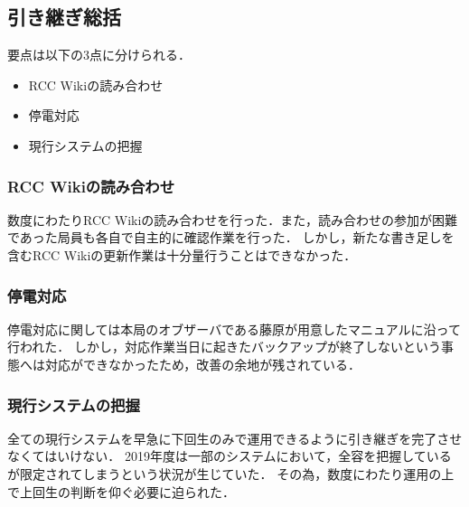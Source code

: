 \subsection*{引き継ぎ総括}


要点は以下の3点に分けられる．
 \begin{itemize}
\item RCC Wikiの読み合わせ
\item 停電対応
\item 現行システムの把握
 \end{itemize}
\subsubsection* {RCC Wikiの読み合わせ}
数度にわたりRCC Wikiの読み合わせを行った．また，読み合わせの参加が困難であった局員も各自で自主的に確認作業を行った．
しかし，新たな書き足しを含むRCC Wikiの更新作業は十分量行うことはできなかった．
\subsubsection* {停電対応}
停電対応に関しては本局のオブザーバである藤原が用意したマニュアルに沿って行われた．
しかし，対応作業当日に起きたバックアップが終了しないという事態へは対応ができなかったため，改善の余地が残されている．
\subsubsection* {現行システムの把握}
全ての現行システムを早急に下回生のみで運用できるように引き継ぎを完了させなくてはいけない．
2019年度は一部のシステムにおいて，全容を把握している\systemStaff{}が限定されてしまうという状況が生じていた．
その為，数度にわたり運用の上で上回生の判断を仰ぐ必要に迫られた．
